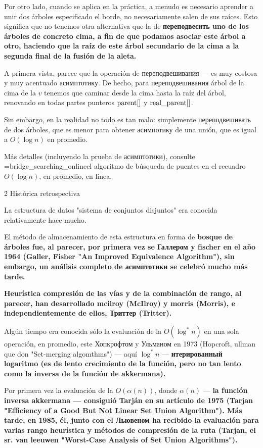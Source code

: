 Por otro lado, cuando se aplica en la práctica, a menudo es necesario aprender a unir dos árboles especificado el borde, no necesariamente salen de sus raíces. Esto significa que no tenemos otra alternativa que la de \bf{переподвесить} uno de los árboles de concreto cima, a fin de que podamos asociar este árbol a otro, haciendo que la raíz de este árbol secundario de la cima a la segunda final de la fusión de la aleta.

A primera vista, parece que la operación de переподвешивания --- es muy costosa y muy acentuado асимптотику. De hecho, para переподвешивания árbol de la cima de la $v$ tenemos que caminar desde la cima hasta la raíz del árbol, renovando en todas partes punteros ${\rm parent}[]$ y ${\rm real\_parent}[]$.

Sin embargo, en la realidad no todo es tan malo: simplemente переподвешивать de dos árboles, que es menor para obtener асимпотику de una unión, que es igual a $O (\log n)$ en promedio.

Más detalles (incluyendo la prueba de асимптотики), consulte \algohref=bridge_searching_online{el algoritmo de búsqueda de puentes en el recuadro $O(\log n)$, en promedio, en línea}.




\h2{ Histórica retrospectiva }

La estructura de datos "sistema de conjuntos disjuntos" era conocida relativamente hace mucho.

El método de almacenamiento de esta estructura en forma de \bf{bosque de árboles} fue, al parecer, por primera vez se Галлером y fischer en el año 1964 (Galler, Fisher "An Improved Equivalence Algorithm"), sin embargo, un análisis completo de асимптотики se celebró mucho más tarde.

\bf{Heurística} compresión de las vías y de la combinación de rango, al parecer, han desarrollado mcilroy (McIlroy) y morris (Morris), e independientemente de ellos, Триттер (Tritter).

Algún tiempo era conocida sólo la evaluación de la $O(\log^* n)$ en una sola operación, en promedio, este Хопкрофтом y Ульманом en 1973 (Hopcroft, ullman que don "Set-merging algomthms") --- aquí $\log^* n$ --- \bf{итерированный logaritmo} (es de lento crecimiento de la función, pero no tan lento como la inversa de la función de akkermana).

Por primera vez la evaluación de la $O (\alpha(n))$, donde $\alpha(n)$ --- \bf{la función inversa akkermana} --- consiguió Tarján en su artículo de 1975 (Tarjan "Efficiency of a Good But Not Linear Set Union Algorithm"). Más tarde, en 1985, él, junto con el Льювеном ha recibido la evaluación para varias rango heurística y métodos de compresión de la ruta (Tarjan, el sr. van leeuwen "Worst-Case Analysis of Set Union Algorithms").

